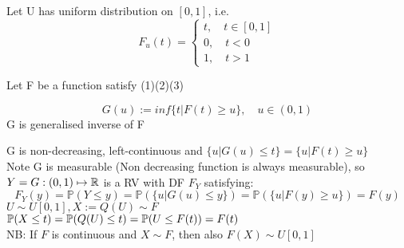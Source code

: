 \begin{example}
Let U has uniform distribution on $[0,1]$, i.e.
\begin{equation*}
    F_u(t) =  \begin{cases}
    t,\quad t\in [0,1] \\
    0, \quad t < 0 \\
    1, \quad t>1
    \end{cases}
\end{equation*}
\end{example}
Let F be a function satisfy (1)(2)(3)
\begin{dfn}
\begin{equation*}
    G(u) :=inf\{t|F(t) \geq u\}, \quad u\in (0,1)
\end{equation*}G is generalised inverse of F
\end{dfn}
G is non-decreasing, left-continuous and $\{u| G(u)\leq t\} = \{u| F(t)\geq u\}$ \\
Note G is measurable (Non decreasing function is always measurable), so $Y = G: (0,1) \mapsto \mathbb{R}$ is a RV with DF $F_Y$ satisfying:
\begin{equation*}
    F_Y(y) = \mathbb{P}(Y\leq y) = \mathbb{P}(\{u| G(u)\leq y\}) = \mathbb{P}(\{u| F(y)\geq u\}) = F(y)
\end{equation*}
$U \sim U[0,1], X:= Q(U) \sim F$ \\
\pf $\mathbb{P}(X\leq t) = \mathbb{P}(Q(U) \leq t) = \mathbb{P}(U \leq F(t)) = F(t)$ \\
NB: If $F$ is continuous and $X \sim F$, then also $F(X) \sim U[0,1]$
\newpage
